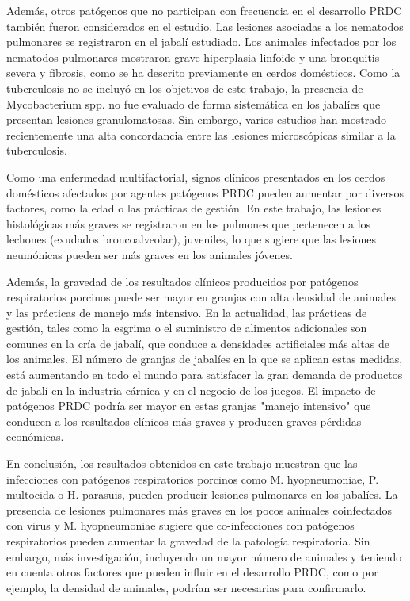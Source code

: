 \documentclass[12pt,a4paper,Spanish]{book}
\begin{document}
Además, otros patógenos que no participan con frecuencia en el desarrollo PRDC también fueron considerados en el estudio. Las lesiones asociadas a los nematodos pulmonares se registraron en el jabalí estudiado. Los animales infectados por los nematodos pulmonares mostraron grave hiperplasia linfoide y una bronquitis severa y fibrosis, como se ha descrito previamente en cerdos domésticos. Como la tuberculosis no se incluyó en los objetivos de este trabajo, la presencia de Mycobacterium spp. no fue evaluado de forma sistemática en los jabalíes que presentan lesiones granulomatosas. Sin embargo, varios estudios han mostrado recientemente una alta concordancia entre las lesiones microscópicas similar a la tuberculosis.

Como una enfermedad multifactorial, signos clínicos presentados en los cerdos domésticos afectados por agentes patógenos PRDC pueden aumentar por diversos factores, como la edad o las prácticas de gestión. En este trabajo, las lesiones histológicas más graves se registraron en los pulmones que pertenecen a los lechones (exudados broncoalveolar), juveniles, lo que sugiere que las lesiones neumónicas pueden ser más graves en los animales jóvenes.

Además, la gravedad de los resultados clínicos producidos por patógenos respiratorios porcinos puede ser mayor en granjas con alta densidad de animales y las prácticas de manejo más intensivo. En la actualidad, las prácticas de gestión, tales como la esgrima o el suministro de alimentos adicionales son comunes en la cría de jabalí, que conduce a densidades artificiales más altas de los animales. El número de granjas de jabalíes en la que se aplican estas medidas, está aumentando en todo el mundo para satisfacer la gran demanda de productos de jabalí en la industria cárnica y en el negocio de los juegos. El impacto de patógenos PRDC podría ser mayor en estas granjas "manejo intensivo" que conducen a los resultados clínicos más graves y producen graves pérdidas económicas.

En conclusión, los resultados obtenidos en este trabajo muestran que las infecciones con patógenos respiratorios porcinos como M. hyopneumoniae, P. multocida o H. parasuis, pueden producir lesiones pulmonares en los jabalíes. La presencia de lesiones pulmonares más graves en los pocos animales coinfectados con virus y M. hyopneumoniae sugiere que co-infecciones con patógenos respiratorios pueden aumentar la gravedad de la patología respiratoria. Sin embargo, más investigación, incluyendo un mayor número de animales y teniendo en cuenta otros factores que pueden influir en el desarrollo PRDC, como por ejemplo, la densidad de animales, podrían ser necesarias para confirmarlo.
\end{document}
